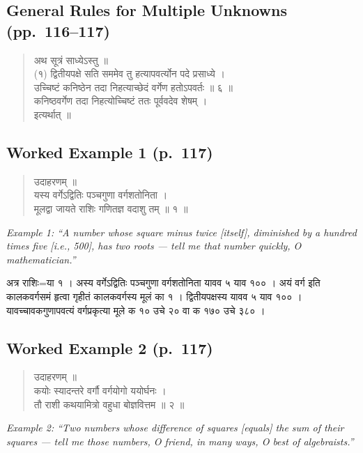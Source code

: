 \documentclass[11pt,a4paper]{article}
\newcommand{\cnote}[1]{\textcolor{notecolor}{\textit{#1}}}
\newcommand{\dev}[1]{{\devanagarifont #1}}
\newenvironment{sanskritverse}{%
  \begin{quote}
}{%
  \end{quote}
}
\begin{document}
\subsection{General Rules for Multiple Unknowns (pp.\ 116--117)}

\begin{sanskritverse}
\dev{%
अथ सूत्रं साध्येऽस्तु ॥\\[0.5em]
(१) द्वितीयपक्षे सति सममेव तु हत्यापवर्त्योन पदे प्रसाध्ये ।\\
उच्चिष्टं कनिष्ठेन तदा निहत्याच्छेदं वर्गेण हतोऽपवर्तः ॥ ६ ॥\\[0.5em]
कनिष्ठवर्गेण तदा निहत्योच्चिष्टं ततः पूर्ववदेव शेषम् ।\\
इत्यर्थात् ॥}
\end{sanskritverse}

\subsection*{Worked Example 1 (p.\ 117)}

\begin{sanskritverse}
\dev{%
उदाहरणम् ॥\\[0.3em]
यस्य वर्गेऽद्वितिः पञ्चगुणा वर्गशतोनिता ।\\
मूलद्वा जायते राशिः गणितज्ञ वदाशु तम् ॥ १ ॥}
\end{sanskritverse}

\cnote{Example 1: ``A number whose square minus twice [itself], diminished by a hundred times five [i.e., 500], has two roots --- tell me that number quickly, O mathematician.''}

\dev{%
अत्र राशिः=या १ । अस्य वर्गेऽद्वितिः पञ्चगुणा वर्गशतोनिता यावव ५ याव १०० । अयं वर्ग इति कालकवर्गसमं हृत्वा गृहीतं कालकवर्गस्य मूलं का १ । द्वितीयपक्षस्य यावव ५ याव १०० ।\\
यावच्चावकगुणापवत्यं वर्गप्रकृत्या मूले क १० उचे २० वा क १७० उचे ३८० ।}

\subsection*{Worked Example 2 (p.\ 117)}

\begin{sanskritverse}
\dev{%
उदाहरणम् ॥\\[0.3em]
कयोः स्यादन्तरे वर्गौ वर्गयोगो ययोर्घनः ।\\
तौ राशी कथयामित्रो वहुधा बोज्ञवित्तम ॥ २ ॥}
\end{sanskritverse}

\cnote{Example 2: ``Two numbers whose difference of squares [equals] the sum of their squares --- tell me those numbers, O friend, in many ways, O best of algebraists.''}
\end{document}
